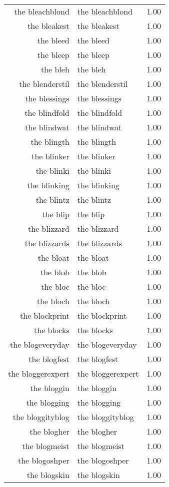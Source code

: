 \begin{table}[ht]
\begin{tabular}{rlr}
  the bleachblond & the bleachblond & 1.00 \\ 
  the bleakest & the bleakest & 1.00 \\ 
  the bleed & the bleed & 1.00 \\ 
  the bleep & the bleep & 1.00 \\ 
  the bleh & the bleh & 1.00 \\ 
  the blenderstil & the blenderstil & 1.00 \\ 
  the blessings & the blessings & 1.00 \\ 
  the blindfold & the blindfold & 1.00 \\ 
  the blindwat & the blindwat & 1.00 \\ 
  the blingth & the blingth & 1.00 \\ 
  the blinker & the blinker & 1.00 \\ 
  the blinki & the blinki & 1.00 \\ 
  the blinking & the blinking & 1.00 \\ 
  the blintz & the blintz & 1.00 \\ 
  the blip & the blip & 1.00 \\ 
  the blizzard & the blizzard & 1.00 \\ 
  the blizzards & the blizzards & 1.00 \\ 
  the bloat & the bloat & 1.00 \\ 
  the blob & the blob & 1.00 \\ 
  the bloc & the bloc & 1.00 \\ 
  the bloch & the bloch & 1.00 \\ 
  the blockprint & the blockprint & 1.00 \\ 
  the blocks & the blocks & 1.00 \\ 
  the blogeveryday & the blogeveryday & 1.00 \\ 
  the blogfest & the blogfest & 1.00 \\ 
  the bloggerexpert & the bloggerexpert & 1.00 \\ 
  the bloggin & the bloggin & 1.00 \\ 
  the blogging & the blogging & 1.00 \\ 
  the bloggityblog & the bloggityblog & 1.00 \\ 
  the blogher & the blogher & 1.00 \\ 
  the blogmeist & the blogmeist & 1.00 \\ 
  the blogoshper & the blogoshper & 1.00 \\ 
  the blogskin & the blogskin & 1.00 \\ 

\end{tabular}
\end{table}
